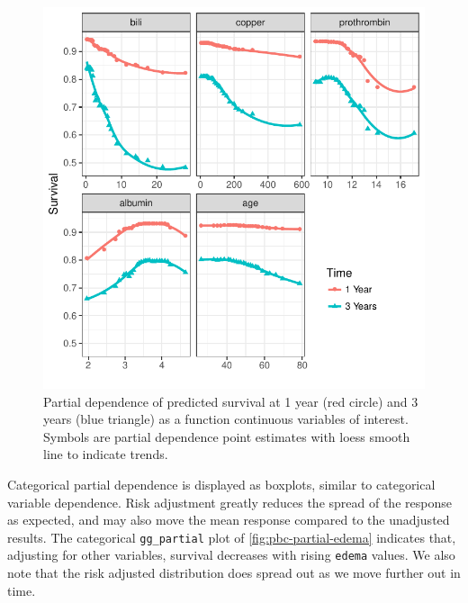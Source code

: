 \documentclass[article, nojss]{jss}
\begin{document}
\begin{Schunk}
\begin{figure}[!htb]

{\centering \includegraphics{rfs-pbc-partial-panel-1}

}

\caption[Partial dependence of predicted survival at 1 year (red circle) and 3 years (blue triangle) as a function continuous variables of interest]{Partial dependence of predicted survival at 1 year (red circle) and 3 years (blue triangle) as a function continuous variables of interest. Symbols are partial dependence point estimates with loess smooth line to indicate trends.}\label{fig:pbc-partial-panel}
\end{figure}
\end{Schunk}

Categorical partial dependence is displayed as boxplots, similar to
categorical variable dependence. Risk adjustment greatly reduces the
spread of the response as expected, and may also move the mean response
compared to the unadjusted results. The categorical \texttt{gg\_partial}
plot of \autoref{fig:pbc-partial-edema} indicates that, adjusting for
other variables, survival decreases with rising \texttt{edema} values.
We also note that the risk adjusted distribution does spread out as we
move further out in time.
\end{document}
